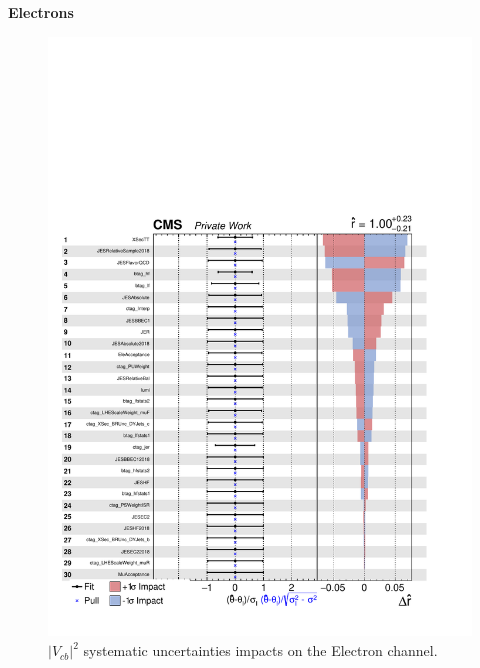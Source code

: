 \vfill
\hspace{0pt}
\pagebreak
\\
\\
\\
\\
\\
\hspace{0pt}
\vfill
\begin{center}
     {\Huge \textbf{Electrons}}
\end{center}
\begin{figure}[H]
    \centering
    \includegraphics[width=\linewidth]{fig/chap09-sigback/electron_impact.pdf}
    \caption{$|V_{cb}|^2$ systematic uncertainties impacts on the Electron channel.}
    \label{fig:EleImpact}
\end{figure}
\vfill
\hspace{0pt}

